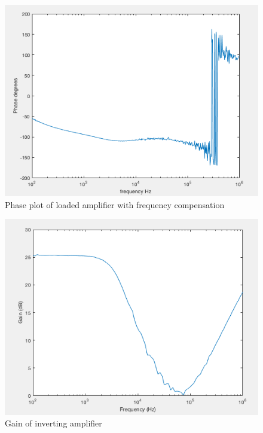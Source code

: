 		\begin{figure}[H]
	\begin{center}
		\includegraphics[scale=.40]{ExperimentalImplementation/phasewithcomp.png}
		\caption{Phase plot of loaded amplifier with frequency compensation}
		\label{fig:phasewithcomp}
	\end{center}
\end{figure}



		\begin{figure}[H]
	\begin{center}
		\includegraphics[scale=.40]{ExperimentalImplementation/invertingain.png}
		\caption{Gain of inverting amplifier}
		\label{fig:invertinggain}
	\end{center}
\end{figure}

